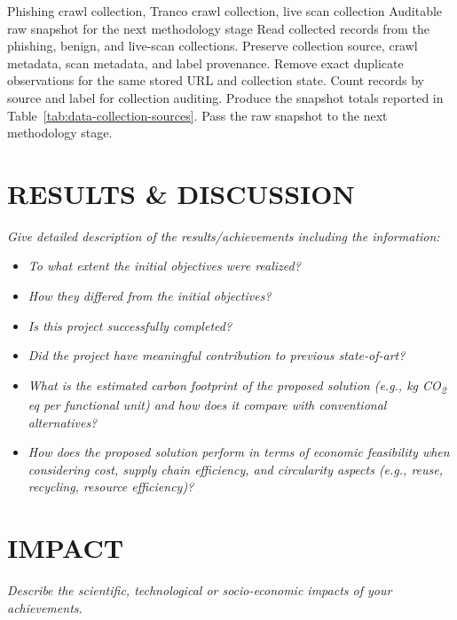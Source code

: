 \documentclass[12pt,letterpaper]{article}
\begin{document}
\begin{algorithm}[htbp]
\caption{Raw collection snapshot construction}
\label{alg:raw-snapshot-construction}
\begin{algorithmic}[1]
\Require Phishing crawl collection, Tranco crawl collection, live scan collection
\Ensure Auditable raw snapshot for the next methodology stage
\State Read collected records from the phishing, benign, and live-scan collections.
\State Preserve collection source, crawl metadata, scan metadata, and label provenance.
\State Remove exact duplicate observations for the same stored URL and collection state.
\State Count records by source and label for collection auditing.
\State Produce the snapshot totals reported in Table~\ref{tab:data-collection-sources}.
\State Pass the raw snapshot to the next methodology stage.
\end{algorithmic}
\end{algorithm}

\section{RESULTS \& DISCUSSION}
\textit{Give detailed description of the results/achievements including the information:}

\begin{itemize}
\item \textit{To what extent the initial objectives were realized?}
\item \textit{How they differed from the initial objectives?}
\item \textit{Is this project successfully completed?}
\item \textit{Did the project have meaningful contribution to previous state-of-art?}
\item \textit{What is the estimated carbon footprint of the proposed solution (e.g., kg CO\textsubscript{2} eq per functional unit) and how does it compare with conventional alternatives?}
\item \textit{How does the proposed solution perform in terms of economic feasibility when considering cost, supply chain efficiency, and circularity aspects (e.g., reuse, recycling, resource efficiency)?}
\end{itemize}

\section{IMPACT}
\textit{Describe the scientific, technological or socio-economic impacts of your achievements.}
\end{document}
